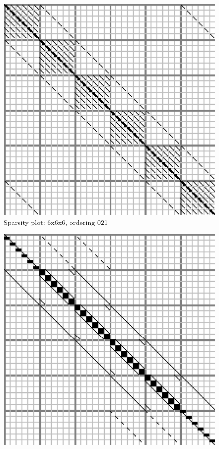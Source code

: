 \documentclass[10pt]{article}
\begin{document}
\begin{multicols}{2}
\begin{center}
\begin{minipage}[t]{.5\textwidth}
\begin{figure}[H]
    \includegraphics[width=\spwidth]{../img/sparsity/int_small_6x6x6_021.eps}
    \caption{Sparsity plot: 6x6x6, ordering 021 }
\end{figure}
\vspace{\spmgin}
\begin{figure}[H]
    \centering
    \includegraphics[width=\spwidth]{../img/sparsity/int_small_6x6x6_102.eps}

\end{figure}
\end{minipage}
\end{center}
\end{multicols}
\end{document}
